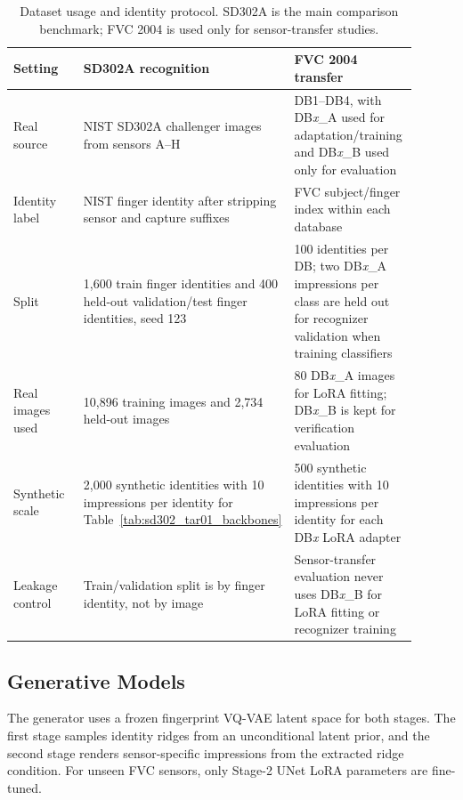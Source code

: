 \documentclass{article}
\begin{document}
\begin{table}[!htbp]
    \centering
    \small
    \caption{Dataset usage and identity protocol.  SD302A is the main
    comparison benchmark; FVC 2004 is used only for sensor-transfer studies.}
    \label{tab:appendix_dataset_protocol}
    \setlength{\tabcolsep}{5pt}
    \renewcommand{\arraystretch}{1.05}
    \begin{tabular}{p{0.24\linewidth}|p{0.33\linewidth}p{0.33\linewidth}}
        \toprule
        Setting & SD302A recognition & FVC 2004 transfer \\
        \midrule
        Real source
        & NIST SD302A challenger images from sensors A--H
        & DB1--DB4, with DB\emph{x}\_A used for adaptation/training and
        DB\emph{x}\_B used only for evaluation \\
        Identity label
        & NIST finger identity after stripping sensor and capture suffixes
        & FVC subject/finger index within each database \\
        Split
        & 1,600 train finger identities and 400 held-out validation/test finger
        identities, seed 123
        & 100 identities per DB; two DB\emph{x}\_A impressions per class are
        held out for recognizer validation when training classifiers \\
        Real images used
        & 10,896 training images and 2,734 held-out images
        & 80 DB\emph{x}\_A images for LoRA fitting; DB\emph{x}\_B is kept for
        verification evaluation \\
        Synthetic scale
        & 2,000 synthetic identities with 10 impressions per identity for
        Table~\ref{tab:sd302_tar01_backbones}
        & 500 synthetic identities with 10 impressions per identity for each
        DB\emph{x} LoRA adapter \\
        Leakage control
        & Train/validation split is by finger identity, not by image
        & Sensor-transfer evaluation never uses DB\emph{x}\_B for LoRA fitting
        or recognizer training \\
        \bottomrule
    \end{tabular}
\end{table}
\FloatBarrier

\subsection{Generative Models}

The generator uses a frozen fingerprint VQ-VAE latent space for both stages.
The first stage samples identity ridges from an unconditional latent prior, and
the second stage renders sensor-specific impressions from the extracted ridge
condition.  For unseen FVC sensors, only Stage-2 UNet LoRA parameters are
fine-tuned.
\end{document}
